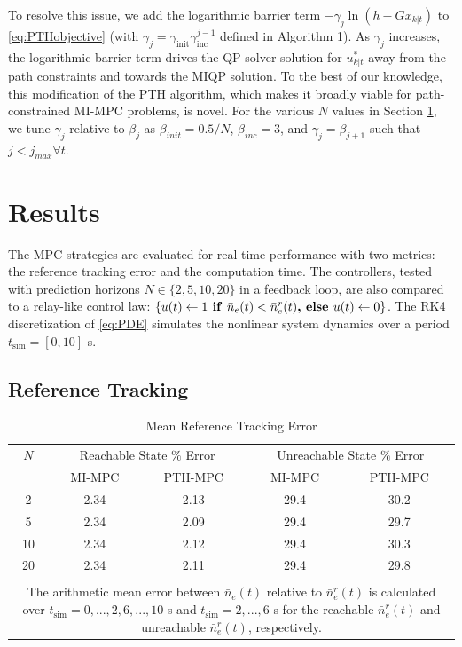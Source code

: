 \documentclass[journal,twoside,web]{ieeecolor}
\begin{document}
To resolve this issue, we add the logarithmic barrier term $-\gamma_j \ln (h-Gx_{k|t})$ to \eqref{eq:PTHobjective} (with $\gamma_j = \gamma_{\textrm{init}} \gamma_{\textrm{inc}}^{j-1}$ defined in Algorithm 1). As $\gamma_j$ increases,  the logarithmic barrier term drives the QP solver solution for $u^*_{k|t}$ away from the path constraints and towards the MIQP solution. To the best of our knowledge, this modification of the PTH algorithm, which makes it broadly viable for path-constrained MI-MPC problems, is novel. For the various $N$ values in Section \ref{sec:results}, we tune $\gamma_j$ relative to $\beta_j$ as $\beta_{init} = 0.5/N$, $\beta_{inc} = 3$, and $\gamma_j=\beta_{j+1}$ such that $j<j_{max} \forall t$. 


\section{Results}
\label{sec:results}
The MPC strategies are evaluated for real-time performance with two metrics: the reference tracking error and the computation time. The controllers, tested with prediction horizons $N \in \{2,5,10,20\}$ in a feedback loop, are also compared to a relay-like control law: $\{u(t) \leftarrow 1 \textrm{\textbf{ if }} \bar{n}_e(t) < \bar{n}_e^r(t) \textrm{\textbf{, else }} u(t) \leftarrow 0 \}$. The RK4 discretization of \eqref{eq:PDE} simulates the nonlinear system dynamics over a period $t_{\textrm{sim}} = [0,10]$ s. 

\subsection{Reference Tracking}
\label{subsec:refTracking}


\begin{table}[b!]
\caption{Mean Reference Tracking Error}
\centering
\begin{tabular}{ccccc}
\toprule
$N$& \multicolumn{2}{c}{Reachable State $\%$ Error} & \multicolumn{2}{c}{Unreachable State $\%$ Error} \\
\cmidrule(lr){2-3}\cmidrule(lr){4-5}
& MI-MPC & PTH-MPC & MI-MPC & PTH-MPC\\ 
\midrule
2 & 2.34 & 2.13 & 29.4 & 30.2 \\
5 & 2.34 & 2.09 & 29.4 & 29.7 \\
10 & 2.34 & 2.12 & 29.4 & 30.3 \\
20 & 2.34 & 2.11 & 29.4 & 29.8 \\ 
\bottomrule \\
\multicolumn{5}{p{230pt}}{The arithmetic mean error between $\bar{n}_e(t)$ relative to $\bar{n}_e^r(t)$ is calculated over $t_{\textrm{sim}} = 0,...,2,6,...,10$ s and $t_{\textrm{sim}} = 2,...,6$ s for the reachable $\bar{n}_e^r(t)$ and unreachable $\bar{n}_e^r(t)$, respectively.}
\end{tabular}
\label{tab:error}
\end{table}
\end{document}
